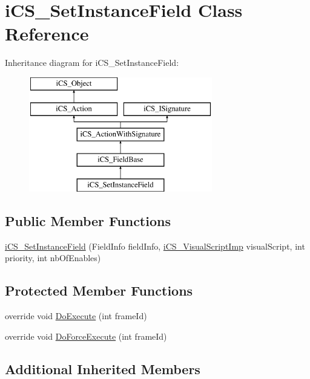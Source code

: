 \hypertarget{classi_c_s___set_instance_field}{\section{i\+C\+S\+\_\+\+Set\+Instance\+Field Class Reference}
\label{classi_c_s___set_instance_field}
}
Inheritance diagram for i\+C\+S\+\_\+\+Set\+Instance\+Field\+:\begin{figure}[H]
\begin{center}
\leavevmode
\includegraphics[height=5.000000cm]{classi_c_s___set_instance_field}
\end{center}
\end{figure}
\subsection*{Public Member Functions}
\begin{DoxyCompactItemize}
\item 
\hyperlink{classi_c_s___set_instance_field_a8fc49208d71a120313f43fe866dec72e}{i\+C\+S\+\_\+\+Set\+Instance\+Field} (Field\+Info field\+Info, \hyperlink{classi_c_s___visual_script_imp}{i\+C\+S\+\_\+\+Visual\+Script\+Imp} visual\+Script, int priority, int nb\+Of\+Enables)
\end{DoxyCompactItemize}
\subsection*{Protected Member Functions}
\begin{DoxyCompactItemize}
\item 
override void \hyperlink{classi_c_s___set_instance_field_abd0c3abc7eea97a8710d4f942047f173}{Do\+Execute} (int frame\+Id)
\item 
override void \hyperlink{classi_c_s___set_instance_field_a0abdc784c74d45773707fe3559f5643d}{Do\+Force\+Execute} (int frame\+Id)
\end{DoxyCompactItemize}
\subsection*{Additional Inherited Members}


